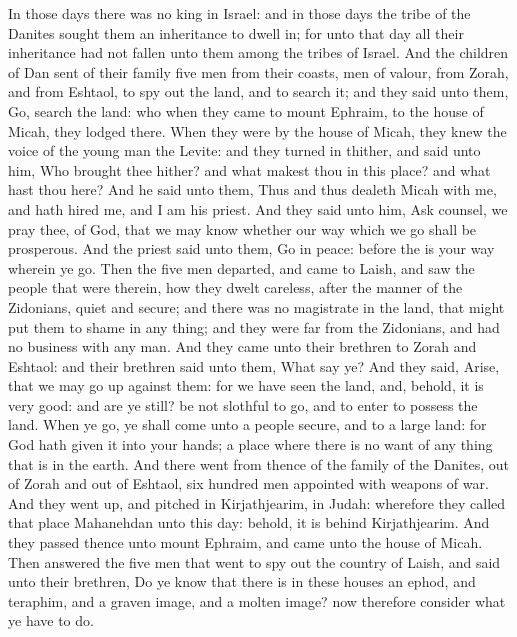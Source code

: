 \begin{biblechapter} %
 In those days there was no king in Israel: and in those days the tribe of the Danites sought them an inheritance to dwell in; for unto that day all their inheritance had not fallen unto them among the tribes of Israel.
\verse And the children of Dan sent of their family five men from their coasts, men of valour, from Zorah, and from Eshtaol, to spy out the land, and to search it; and they said unto them, Go, search the land: who when they came to mount Ephraim, to the house of Micah, they lodged there.
\verse When they were by the house of Micah, they knew the voice of the young man the Levite: and they turned in thither, and said unto him, Who brought thee hither? and what makest thou in this place? and what hast thou here?
\verse And he said unto them, Thus and thus dealeth Micah with me, and hath hired me, and I am his priest.
\verse And they said unto him, Ask counsel, we pray thee, of God, that we may know whether our way which we go shall be prosperous.
\verse And the priest said unto them, Go in peace: before the \LORD is your way wherein ye go.
\verse Then the five men departed, and came to Laish, and saw the people that were therein, how they dwelt careless, after the manner of the Zidonians, quiet and secure; and there was no magistrate in the land, that might put them to shame in any thing; and they were far from the Zidonians, and had no business with any man.
\verse And they came unto their brethren to Zorah and Eshtaol: and their brethren said unto them, What say ye?
\verse And they said, Arise, that we may go up against them: for we have seen the land, and, behold, it is very good: and are ye still? be not slothful to go, and to enter to possess the land.
\verse When ye go, ye shall come unto a people secure, and to a large land: for God hath given it into your hands; a place where there is no want of any thing that is in the earth.
\verse And there went from thence of the family of the Danites, out of Zorah and out of Eshtaol, six hundred men appointed with weapons of war.
\verse And they went up, and pitched in Kirjathjearim, in Judah: wherefore they called that place Mahanehdan unto this day: behold, it is behind Kirjathjearim.
\verse And they passed thence unto mount Ephraim, and came unto the house of Micah.
\verse Then answered the five men that went to spy out the country of Laish, and said unto their brethren, Do ye know that there is in these houses an ephod, and teraphim, and a graven image, and a molten image? now therefore consider what ye have to do.

\end{biblechapter}
